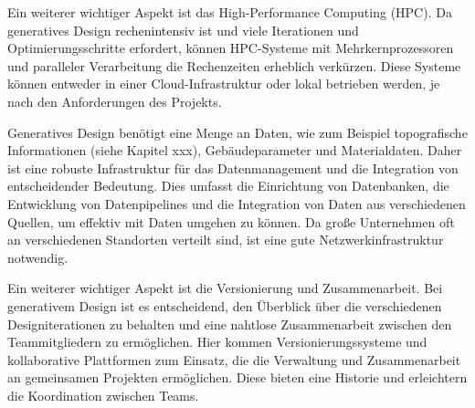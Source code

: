 Ein weiterer wichtiger Aspekt ist das High-Performance Computing (HPC). Da generatives Design rechenintensiv ist und viele Iterationen und Optimierungsschritte erfordert, können HPC-Systeme mit Mehrkernprozessoren und paralleler Verarbeitung die Rechenzeiten erheblich verkürzen. Diese Systeme können entweder in einer Cloud-Infrastruktur oder lokal betrieben werden, je nach den Anforderungen des Projekts.

Generatives Design benötigt eine Menge an Daten, wie zum Beispiel topografische Informationen (siehe Kapitel xxx), Gebäudeparameter und Materialdaten. Daher ist eine robuste Infrastruktur für das Datenmanagement und die Integration von entscheidender Bedeutung. Dies umfasst die Einrichtung von Datenbanken, die Entwicklung von Datenpipelines und die Integration von Daten aus verschiedenen Quellen, um effektiv mit Daten umgehen zu können. Da große Unternehmen oft an verschiedenen Standorten verteilt sind, ist eine gute Netzwerkinfrastruktur notwendig. 

Ein weiterer wichtiger Aspekt ist die Versionierung und Zusammenarbeit. Bei generativem Design ist es entscheidend, den Überblick über die verschiedenen Designiterationen zu behalten und eine nahtlose Zusammenarbeit zwischen den Teammitgliedern zu ermöglichen. Hier kommen Versionierungssysteme und kollaborative Plattformen zum Einsatz, die die Verwaltung und Zusammenarbeit an gemeinsamen Projekten ermöglichen. Diese bieten eine Historie und erleichtern die Koordination zwischen Teams.

